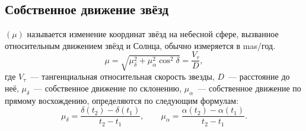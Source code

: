 \subsection{Собственное движение звёзд}
 $(\mu)$ называется изменение координат звёзд на небесной сфере, вызванное относительным движением звёзд и Солнца, обычно измеряется в mas/год.
\begin{equation}
	\mu = \sqrt{\mu_\delta^2 + \mu_\alpha^2 \cos^2 \delta} = \frac{V_\tau}{D},
\end{equation}
где $V_\tau$~--- тангенциальная относительная скорость звезды, $D$~--- расстояние до неё, $\mu_\delta$~--- собственное движение по склонению, $\mu_\alpha$~--- собственное движение по прямому восхождению, определяются по следующим формулам:
\begin{equation}
  \mu_\delta = \frac{\delta(t_2) - \delta(t_1)}{t_2 - t_1}, \quad \quad \mu_\alpha = \frac{\alpha(t_2) - \alpha(t_1)}{t_2 - t_1}.
\end{equation}
